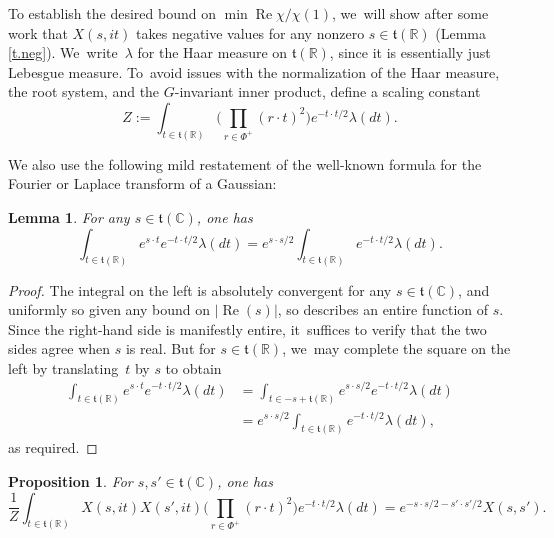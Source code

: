 \documentclass[JEP,XML,SOM,Unicode,NoFloatCountersInSection,published]{cedram}
\newtheorem{lem}[equation]{Lemma}
\newtheorem{prop}[equation]{Proposition}
\theoremstyle{definition}
\newcommand{\mft}{\mathfrak{t}}
\newcommand{\R}{\mathbb{R}}
\newcommand{\C}{\mathbb{C}}
\DeclareMathOperator{\RE}{Re}
\begin{document}
To establish the desired bound on $\min\RE\chi/\chi(1)$, we~will
show after some work that $X(s,it)$ takes negative values for any nonzero $s\in \mft(\R)$ (Lemma \ref{t.neg}). We~write~$\lambda$ for the Haar measure on $\mft(\R)$, since it is essentially just Lebesgue measure.
To~avoid issues with the normalization of the Haar measure, the root
system, and the $G$\nobreakdash-invariant inner product, define a scaling constant
\[
Z := \int_{t\in \mft(\R)} \biggl( \prod_{r\in \Phi^+}(r\cdot t)^2 \biggr) e^{-t\cdot
t/2}
\lambda(dt).
\]

We also use the following mild restatement of the well-known formula for the Fourier or Laplace transform of a Gaussian:
\begin{lem} \label{fourier}
For any $s\in \mft(\C)$, one has
\[
\int_{t \in \mft(\R)} e^{s\cdot t} e^{-t\cdot t/2} \lambda(dt)
=
e^{s\cdot s/2} \int_{t \in \mft(\R)} e^{-t\cdot t/2} \lambda(dt).
\]
\end{lem}

\begin{proof}
The integral on the left is absolutely convergent for any $s\in \mft(\C)$, and uniformly so given any bound on $\left|\RE(s)\right|$, so describes an entire function of $s$. Since the right-hand side is manifestly entire, it~suffices to verify that the two sides agree when $s$ is real. But for $s\in \mft(\R)$, we~may complete the square on the left by translating~$t$ by $s$ to obtain
\begin{align*}
\int_{t\in \mft(\R)} e^{s\cdot t} e^{-t\cdot t/2} \lambda(dt)
&=
\int_{t\in -s+\mft(\R)} e^{s\cdot s/2} e^{-t\cdot t/2} \lambda(dt)\\
&=
e^{s\cdot s/2} \int_{t\in \mft(\R)} e^{-t\cdot t/2} \lambda(dt),
\end{align*}
as required.
\end{proof}

\begin{prop} \label{158}
For $s,s'\in \mft(\C)$, one has
\[
\frac{1}{Z}
\int_{t\in \mft(\R)} X(s,it)X(s',it)
\biggl( \prod_{r\in \Phi^+} (r\cdot t)^2 \biggr)
e^{-t\cdot t/2}
\lambda(dt)
= 
e^{-s\cdot s/2-s'\cdot s'/2}
X(s,s').
\]
\end{prop}
\end{document}
